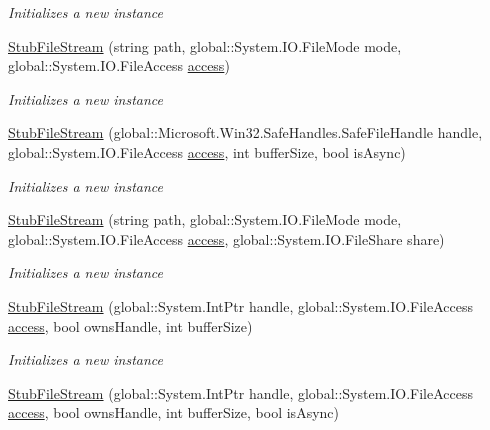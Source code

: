 \begin{DoxyCompactItemize}
\begin{DoxyCompactList}\small\item\em Initializes a new instance\end{DoxyCompactList}\item 
\hyperlink{class_system_1_1_i_o_1_1_fakes_1_1_stub_file_stream_ae7f533ee092c899eef2ae32e468d5f5e}{Stub\-File\-Stream} (string path, global\-::\-System.\-I\-O.\-File\-Mode mode, global\-::\-System.\-I\-O.\-File\-Access \hyperlink{jquery-1_810_82-vsdoc_8js_a130ad18d21e14ee566dbf4eb185f2bda}{access})
\begin{DoxyCompactList}\small\item\em Initializes a new instance\end{DoxyCompactList}\item 
\hyperlink{class_system_1_1_i_o_1_1_fakes_1_1_stub_file_stream_ab75fa7d171b61c6e934819ab97d809f9}{Stub\-File\-Stream} (global\-::\-Microsoft.\-Win32.\-Safe\-Handles.\-Safe\-File\-Handle handle, global\-::\-System.\-I\-O.\-File\-Access \hyperlink{jquery-1_810_82-vsdoc_8js_a130ad18d21e14ee566dbf4eb185f2bda}{access}, int buffer\-Size, bool is\-Async)
\begin{DoxyCompactList}\small\item\em Initializes a new instance\end{DoxyCompactList}\item 
\hyperlink{class_system_1_1_i_o_1_1_fakes_1_1_stub_file_stream_ab230e185ca68ff581a3fb2441c8dc765}{Stub\-File\-Stream} (string path, global\-::\-System.\-I\-O.\-File\-Mode mode, global\-::\-System.\-I\-O.\-File\-Access \hyperlink{jquery-1_810_82-vsdoc_8js_a130ad18d21e14ee566dbf4eb185f2bda}{access}, global\-::\-System.\-I\-O.\-File\-Share share)
\begin{DoxyCompactList}\small\item\em Initializes a new instance\end{DoxyCompactList}\item 
\hyperlink{class_system_1_1_i_o_1_1_fakes_1_1_stub_file_stream_af283bad4eb816dfc64e1f6f0e3ef39b7}{Stub\-File\-Stream} (global\-::\-System.\-Int\-Ptr handle, global\-::\-System.\-I\-O.\-File\-Access \hyperlink{jquery-1_810_82-vsdoc_8js_a130ad18d21e14ee566dbf4eb185f2bda}{access}, bool owns\-Handle, int buffer\-Size)
\begin{DoxyCompactList}\small\item\em Initializes a new instance\end{DoxyCompactList}\item 
\hyperlink{class_system_1_1_i_o_1_1_fakes_1_1_stub_file_stream_a319c79d6445f2bab4b31f61bb8de1bc3}{Stub\-File\-Stream} (global\-::\-System.\-Int\-Ptr handle, global\-::\-System.\-I\-O.\-File\-Access \hyperlink{jquery-1_810_82-vsdoc_8js_a130ad18d21e14ee566dbf4eb185f2bda}{access}, bool owns\-Handle, int buffer\-Size, bool is\-Async)

\end{DoxyCompactItemize}
